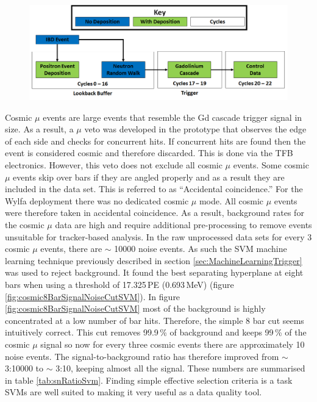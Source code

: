 \begin{figure}[!h]
 \centering
 \includegraphics[width=\linewidth]{Chapter6/Figs/CycleExplaination.png}
 \label{fig:CycleExplaination}
\end{figure}

Cosmic $\mu$ events are large events that resemble the Gd cascade trigger signal in size. As a result, a $\mu$ veto was developed in the prototype that observes the edge of each side and checks for concurrent hits. If concurrent hits are found then the event is considered cosmic and therefore discarded. This is done via the TFB electronics. However, this veto does not exclude all cosmic $\mu$ events. Some cosmic $\mu$ events skip over bars if they are angled properly and as a result they are included in the data set. This is referred to as ``Accidental coincidence.'' For the Wylfa deployment there was no dedicated cosmic $\mu$ mode. All cosmic $\mu$ events were therefore taken in accidental coincidence. As a result, background rates for the cosmic $\mu$ data are high and require additional pre-processing to remove events unsuitable for tracker-based analysis. In the raw unprocessed data sets for every 3 cosmic $\mu$ events, there are $\sim$ 10000 noise events. As such the SVM machine learning technique previously described in section \ref{sec:MachineLearningTrigger} was used to reject background. It found the best separating hyperplane at eight bars when using a threshold of 17.325\,PE (0.693\,MeV) (figure \ref{fig:cosmic8BarSignalNoiseCutSVM}). In figure \ref{fig:cosmic8BarSignalNoiseCutSVM} most of the background is highly concentrated at a low number of bar hits. Therefore, the simple 8 bar cut seems intuitively correct. This cut removes 99.9\,\% of background and keeps 99\,\% of the cosmic $\mu$ signal so now for every three cosmic events there are approximately 10 noise events. The signal-to-background ratio has therefore improved from $\sim$ 3:10000 to $\sim$ 3:10, keeping almost all the signal. These numbers are summarised in table \ref{tab:snRatioSvm}. Finding simple effective selection criteria is a task SVMs are well suited to making it very useful as a data quality tool. 

